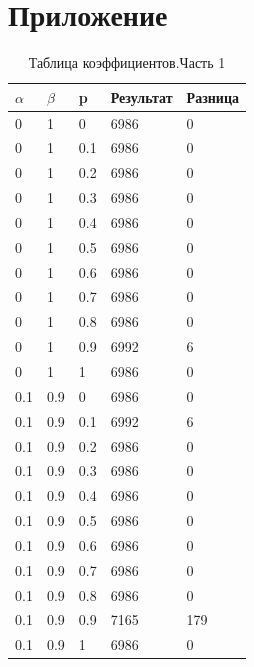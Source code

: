 \documentclass[12pt,a4paper]{report}
\begin{document}
\newpage
\chapter*{Приложение}


\begin{table}[ht]
	\centering
	\caption{Таблица коэффициентов.Часть 1}
	\label{table:ref1}
	\begin{tabular}{ | l | l | l | l | l |}
		\hline
		$\alpha$ & $\beta$ & p   & Результат & Разница \\
		\hline
		0        & 1       & 0   & 6986      & 0       \\
		0        & 1       & 0.1 & 6986      & 0       \\
		0        & 1       & 0.2 & 6986      & 0       \\
		0        & 1       & 0.3 & 6986      & 0       \\
		0        & 1       & 0.4 & 6986      & 0       \\
		0        & 1       & 0.5 & 6986      & 0       \\
		0        & 1       & 0.6 & 6986      & 0       \\
		0        & 1       & 0.7 & 6986      & 0       \\
		0        & 1       & 0.8 & 6986      & 0       \\
		0        & 1       & 0.9 & 6992      & 6       \\
		0        & 1       & 1   & 6986      & 0       \\
		0.1      & 0.9     & 0   & 6986      & 0       \\
		0.1      & 0.9     & 0.1 & 6992      & 6       \\
		0.1      & 0.9     & 0.2 & 6986      & 0       \\
		0.1      & 0.9     & 0.3 & 6986      & 0       \\
		0.1      & 0.9     & 0.4 & 6986      & 0       \\
		0.1      & 0.9     & 0.5 & 6986      & 0       \\
		0.1      & 0.9     & 0.6 & 6986      & 0       \\
		0.1      & 0.9     & 0.7 & 6986      & 0       \\
		0.1      & 0.9     & 0.8 & 6986      & 0       \\
		0.1      & 0.9     & 0.9 & 7165      & 179     \\
		0.1      & 0.9     & 1   & 6986      & 0       \\

\end{tabular}
\end{table}
\end{document}
